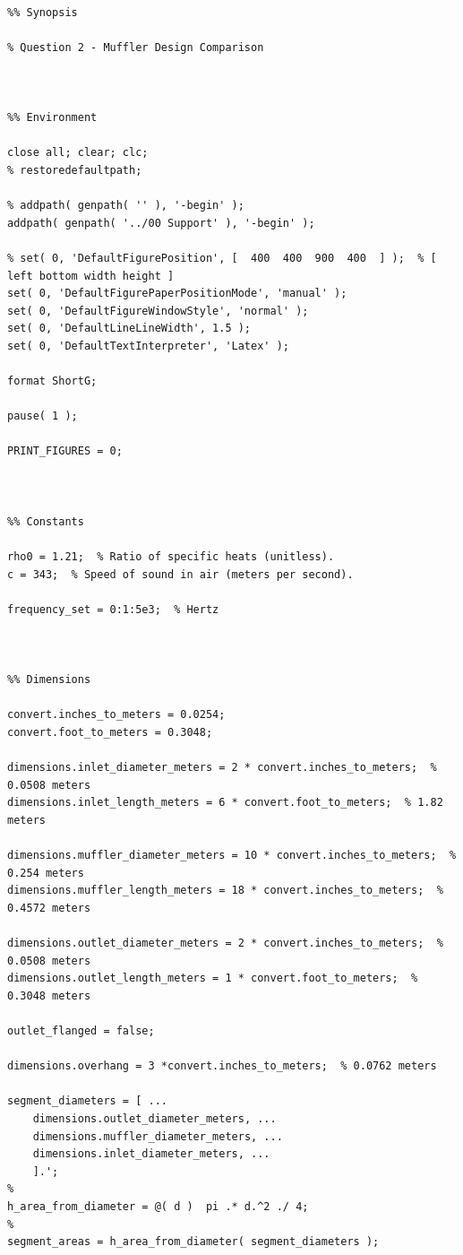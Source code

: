 \begin{lstlisting}[style=Matlab-editor, basicstyle=\fontfamily{pcr}, numbers=none, keepspaces, mlshowsectionrules, basicstyle=\footnotesize]

%% Synopsis

% Question 2 - Muffler Design Comparison



%% Environment

close all; clear; clc;
% restoredefaultpath;

% addpath( genpath( '' ), '-begin' );
addpath( genpath( '../00 Support' ), '-begin' );

% set( 0, 'DefaultFigurePosition', [  400  400  900  400  ] );  % [ left bottom width height ]
set( 0, 'DefaultFigurePaperPositionMode', 'manual' );
set( 0, 'DefaultFigureWindowStyle', 'normal' );
set( 0, 'DefaultLineLineWidth', 1.5 );
set( 0, 'DefaultTextInterpreter', 'Latex' );

format ShortG;

pause( 1 );

PRINT_FIGURES = 0;



%% Constants

rho0 = 1.21;  % Ratio of specific heats (unitless).
c = 343;  % Speed of sound in air (meters per second).

frequency_set = 0:1:5e3;  % Hertz



%% Dimensions

convert.inches_to_meters = 0.0254;
convert.foot_to_meters = 0.3048;

dimensions.inlet_diameter_meters = 2 * convert.inches_to_meters;  % 0.0508 meters
dimensions.inlet_length_meters = 6 * convert.foot_to_meters;  % 1.82 meters

dimensions.muffler_diameter_meters = 10 * convert.inches_to_meters;  % 0.254 meters
dimensions.muffler_length_meters = 18 * convert.inches_to_meters;  % 0.4572 meters

dimensions.outlet_diameter_meters = 2 * convert.inches_to_meters;  % 0.0508 meters
dimensions.outlet_length_meters = 1 * convert.foot_to_meters;  % 0.3048 meters

outlet_flanged = false;

dimensions.overhang = 3 *convert.inches_to_meters;  % 0.0762 meters

segment_diameters = [ ...
    dimensions.outlet_diameter_meters, ...
    dimensions.muffler_diameter_meters, ...
    dimensions.inlet_diameter_meters, ...
    ].';
%
h_area_from_diameter = @( d )  pi .* d.^2 ./ 4;
%
segment_areas = h_area_from_diameter( segment_diameters );


\end{lstlisting}
